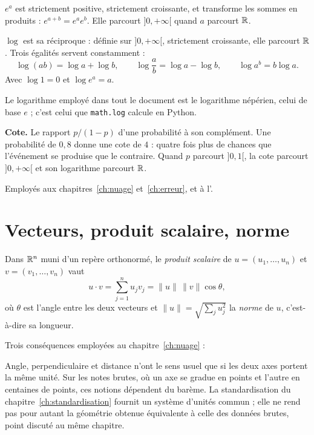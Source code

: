 $e^{a}$ est strictement positive, strictement croissante, et transforme les
sommes en produits : $e^{a+b}=e^{a}e^{b}$. Elle parcourt $]0,+\infty[$ quand $a$
parcourt $\mathbb{R}$.

$\log$ est sa réciproque : définie sur $]0,+\infty[$, strictement croissante,
elle parcourt $\mathbb{R}$. Trois égalités servent constamment :
\[
  \log(ab)=\log a+\log b,\qquad
  \log\frac{a}{b}=\log a-\log b,\qquad
  \log a^{b}=b\log a .
\]
Avec $\log 1=0$ et $\log e^{a}=a$.

Le logarithme employé dans tout le document est le logarithme népérien, celui de
base $e$ ; c'est celui que \texttt{math.log} calcule en Python.

\textbf{Cote.} Le rapport $p/(1-p)$ d'une probabilité à son complément. Une
probabilité de $0{,}8$ donne une cote de $4$ : quatre fois plus de chances que
l'événement se produise que le contraire. Quand $p$ parcourt $]0,1[$, la cote
parcourt $]0,+\infty[$ et son logarithme parcourt $\mathbb{R}$.

Employés aux chapitres~\ref{ch:nuage} et~\ref{ch:erreur}, et à
l'.

\section{Vecteurs, produit scalaire, norme}

Dans $\mathbb{R}^n$ muni d'un repère orthonormé, le \emph{produit scalaire} de
$u=(u_1,\dots,u_n)$ et $v=(v_1,\dots,v_n)$ vaut
\[
  u\cdot v=\sum_{j=1}^{n} u_jv_j = \|u\|\,\|v\|\cos\theta,
\]
où $\theta$ est l'angle entre les deux vecteurs et
$\|u\|=\sqrt{\sum_j u_j^2}$ la \emph{norme} de $u$, c'est-à-dire sa longueur.

Trois conséquences employées au chapitre~\ref{ch:nuage} :

\begin{panelitemize}[accent]
\end{panelitemize}

\begin{vigilance}
Angle, perpendiculaire et distance n'ont le sens usuel que si les deux axes
portent la même unité. Sur les notes brutes, où un axe se gradue en points et
l'autre en centaines de points, ces notions dépendent du barème. La
standardisation du chapitre~\ref{ch:standardisation} fournit un système d'unités
commun ; elle ne rend pas pour autant la géométrie obtenue équivalente à celle
des données brutes, point discuté au même chapitre.
\end{vigilance}

